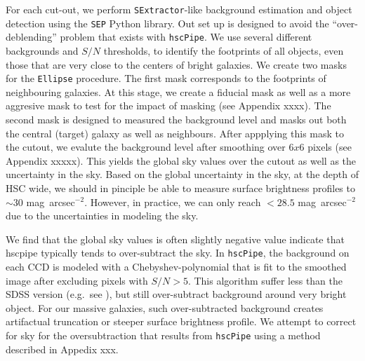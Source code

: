 \documentclass{emulateapj}
\def\sb{mag~arcsec$^{-2}$}
\begin{document}
\begin{CJK*}{UTF8}{gbsn}
    For each cut-out, we perform \texttt{SExtractor}-like background estimation and object detection using the \texttt{SEP} Python library. Out set up is designed to avoid the ``over-deblending'' problem that exists with \texttt{hscPipe}. We use several different backgrounds and $S/N$ thresholds, to identify the footprints of all objects, even those that are very close to the centers of bright galaxies. We create two masks for the \texttt{Ellipse} procedure. The first mask corresponds to the footprints of neighbouring galaxies. At this stage, we create a fiducial mask as well as a more aggresive mask to test for the impact of masking (see Appendix xxxx). The second mask is designed to measured the background level and masks out both the central (target) galaxy as well as neighbours. After appplying this mask to the cutout, we evalute the background level after smoothing over $6x6$  pixels (see Appendix xxxxx). This yields the global sky values over the cutout as well as the uncertainty in the sky. Based on the global uncertainty in the sky, at the depth of HSC wide, we should in pinciple be able to measure surface brightness profiles to $\sim 30$ \sb. However, in practice, we can only reach $<28.5$ \sb due to the uncertainties in modeling the sky.
    
  
  
    
    
    
    
    
    We find that the global sky values is often slightly negative value indicate that hscpipe typically tends to over-subtract the sky. In \texttt{hscPipe}, the background on each CCD is modeled with a 
    Chebyshev-polynomial that is fit to the smoothed image after excluding pixels with $S/N >5$.
    This algorithm suffer less than the SDSS version (e.g.\ see \citealt{Blanton2011}),
    but still over-subtract background around very bright object. 
    For our massive galaxies, such over-subtracted background creates artifactual
    truncation or steeper surface brightness profile. We attempt to correct for sky for the oversubtraction that results from \texttt{hscPipe} using a method described in Appedix xxx. 
    

\end{CJK*}
\end{document}
